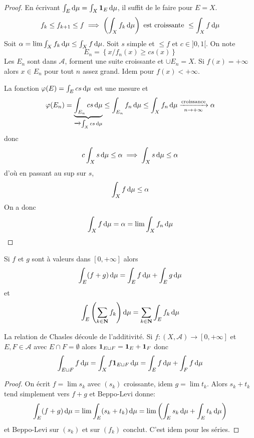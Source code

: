 \begin{proof}
    En écrivant $\int_E\mathop{}\!\mathrm d\mu=\int_X\bm{1}_E\mathop{}\!\mathrm d\mu$, il suffit de le faire pour  $E=X$.  \[
        f_k\leq f_{k+1}\leq f \implies \left( \int_X f_k\mathop{}\!\mathrm d\mu \right) \text{ est croissante  } \leq \int_Xf\mathop{}\!\mathrm d\mu
    \] 
    Soit $\alpha=\lim\int_Xf_k\mathop{}\!\mathrm d \mu\leq \int_X f\mathop{}\!\mathrm d \mu$. Soit $s$ simple et  $\leq f$ et $c \in  ]0,1[$. On note \[
        E_n = \left\{ x / f_n(x)\geq cs(x) \right\} 
    \] 
    Les $E_n$ sont dans  $\mathcal  A$, forment une suite croissante et $\cup E_n=X$. Si  $f(x)=+\infty$ alors $x \in  E_n$ pour tout $n$ assez grand. Idem pour $f(x)<+\infty$.

    La fonction  $\varphi(E)=\int_E cs\mathop{}\!\mathrm d\mu$ est une mesure et  \[
        \varphi(E_n)=\underbrace{\int_{E_n}cs\mathop{}\!\mathrm d\mu}_{\xrightarrow{}\int_Xcs\mathop{}\!\mathrm d\mu}\leq \int_{E_n}f_n\mathop{}\!\mathrm d\mu\leq \int_X f_n\mathop{}\!\mathrm d\mu \xrightarrow[n\to +\infty]{\text{croissance}}\alpha
    \] 
    donc \[
    c\int_Xs\mathop{}\!\mathrm d \mu\leq \alpha \implies \int_Xs\mathop{}\!\mathrm d \mu\leq \alpha
    \]
    d'où en passant au sup sur $s$,  \[
    \int_Xf\mathop{}\!\mathrm d\mu\leq \alpha
    \]
    On a donc \[
    \int_Xf\mathop{}\!\mathrm d\mu = \alpha =\lim \int_X f_n\mathop{}\!\mathrm d\mu
    \] 
\end{proof}

\begin{cor}
    Si $f$ et  $g$ sont à valeurs dans  $[0, +\infty]$ alors  \[
        \int_E(f+g)\mathop{}\!\mathrm d \mu=\int_Ef\mathop{}\!\mathrm d\mu+\int_E g\mathop{}\!\mathrm d\mu
    \] 
    et \[
        \int_E \left(\sum_{k \in  \mathbf N} f_k\right)\mathop{}\!\mathrm d\mu=\sum_{k \in  \mathbf N}\int_Ef_k\mathop{}\!\mathrm d\mu
    \] 
\end{cor}

\begin{rem}
    La relation de Chasles découle de l'additivité. Si $f:(X, \mathcal  A) \longrightarrow [0, +\infty]$ et $E, F \in  \mathcal  A$ avec $E\cap F=\emptyset$ alors $\bm{1}_{E\sqcup F}=\bm{1}_E+\bm{1}_F$ donc \[
        \int_{E\sqcup F} f\mathop{}\!\mathrm d \mu=\int_X f\bm{1}_{E\sqcup F}\mathop{}\!\mathrm d \mu=\int_Ef\mathop{}\!\mathrm d \mu+\int_Ff\mathop{}\!\mathrm d\mu
    \]
\end{rem}

\begin{proof}
    On écrit $f=\lim s_k$ avec  $(s_k)$ croissante, idem $g=\lim t_k$.  Alors $s_k+t_k$ tend simplement vers  $f+g$ et Beppo-Levi donne:  \[
        \int_E(f+g)\mathop{}\!\mathrm d\mu=\lim\int_E(s_k+t_k)\mathop{}\!\mathrm d\mu=\lim \left(\int_Es_k\mathop{}\!\mathrm d \mu+\int_Et_k\mathop{}\!\mathrm d\mu\right)
    \] 
    et Beppo-Levi sur $(s_k)$ et sur  $(f_k)$ conclut. C'est idem pour les séries.
\end{proof}

